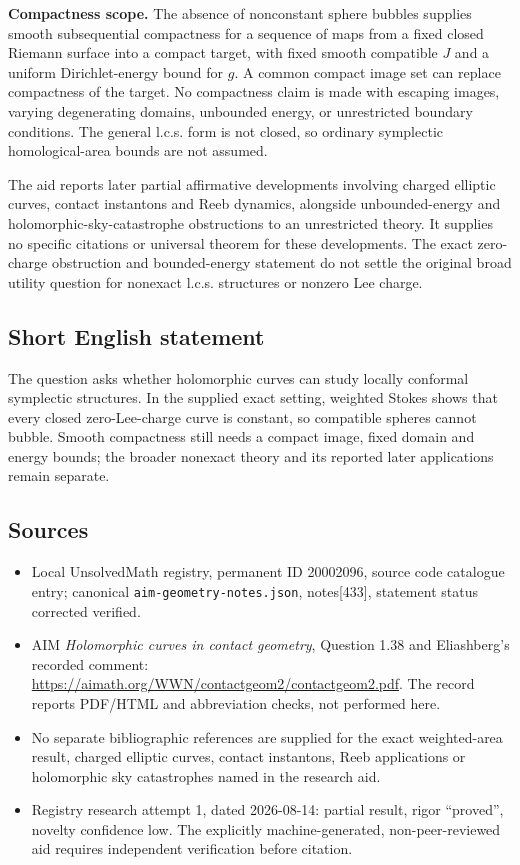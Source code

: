 \documentclass[11pt]{article}
\begin{document}
\textbf{Compactness scope.} The absence of nonconstant sphere bubbles supplies smooth subsequential compactness for a sequence of maps from a fixed closed Riemann surface into a compact target, with fixed smooth compatible $J$ and a uniform Dirichlet-energy bound for $g$. A common compact image set can replace compactness of the target. No compactness claim is made with escaping images, varying degenerating domains, unbounded energy, or unrestricted boundary conditions. The general l.c.s. form is not closed, so ordinary symplectic homological-area bounds are not assumed.

The aid reports later partial affirmative developments involving charged elliptic curves, contact instantons and Reeb dynamics, alongside unbounded-energy and holomorphic-sky-catastrophe obstructions to an unrestricted theory. It supplies no specific citations or universal theorem for these developments. The exact zero-charge obstruction and bounded-energy statement do not settle the original broad utility question for nonexact l.c.s. structures or nonzero Lee charge.
\subsection{Short English statement}
The question asks whether holomorphic curves can study locally conformal symplectic structures. In the supplied exact setting, weighted Stokes shows that every closed zero-Lee-charge curve is constant, so compatible spheres cannot bubble. Smooth compactness still needs a compact image, fixed domain and energy bounds; the broader nonexact theory and its reported later applications remain separate.
\subsection{Sources}
\begin{itemize}
\item Local UnsolvedMath registry, permanent ID 20002096, source code catalogue entry; canonical \texttt{aim-geometry-notes.json}, notes[433], statement status corrected verified.
\item AIM \emph{Holomorphic curves in contact geometry}, Question 1.38 and Eliashberg's recorded comment: \url{https://aimath.org/WWN/contactgeom2/contactgeom2.pdf}. The record reports PDF/HTML and abbreviation checks, not performed here.
\item No separate bibliographic references are supplied for the exact weighted-area result, charged elliptic curves, contact instantons, Reeb applications or holomorphic sky catastrophes named in the research aid.
\item Registry research attempt 1, dated 2026-08-14: partial result, rigor ``proved'', novelty confidence low. The explicitly machine-generated, non-peer-reviewed aid requires independent verification before citation.
\end{itemize}
\end{document}
